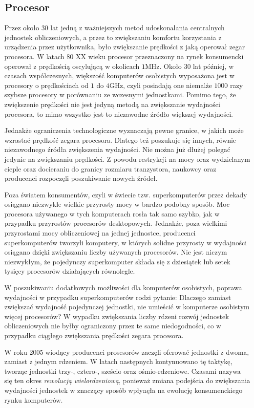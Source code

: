 \subsection{Procesor}
Przez około 30 lat jedną z ważniejszych metod udoskonalania centralnych jednostek obliczeniowych, a przez to zwiększaniu komfortu korzystania z urządzenia przez użytkownika, było zwiększanie prędkości z jaką operował zegar procesora. W latach 80 XX wieku procesor przeznaczony na rynek konsumencki operował z prędkością oscylującą w okolicach $1$MHz. Około 30 lat później, w czasach współczesnych, większość komputerów osobistych wyposażona jest w procesory o prędkościach od $1$ do $4$GHz, czyli posiadają one niemalże $1000$ razy szybsze procesory w porównaniu ze wczesnymi jednostkami. Pomimo tego, że zwiększenie prędkości nie jest jedyną metodą na zwiększanie wydajności procesora, to mimo wszystko jest to niezawodne źródło większej wydajności.

Jednakże ograniczenia technologiczne wyznaczają pewne granice, w jakich może wzrastać prędkość zegara procesora. Dlatego też poszukuje się innych, równie niezawodnego źródła zwiększenia wydajności. Nie można już dłużej polegać jedynie na zwiększaniu prędkości. Z powodu restrykcji na mocy oraz wydzielanym cieple oraz docieraniu do granicy rozmiaru tranzystora, naukowcy oraz producenci rozpoczęli poszukiwanie nowych źródeł.

Poza światem konsumentów, czyli w świecie tzw. superkomputerów przez dekady osiągano niezwykle wielkie przyrosty mocy w bardzo podobny sposób. Moc procesora używanego w tych komputerach rosła tak samo szybko, jak w przypadku przyrostów procesorów desktopowych. Jednakże, poza wielkimi przyrostami mocy obliczeniowej na jednej jednostce, producenci superkomputerów tworzyli komputery, w których solidne przyrosty w wydajności osiągano dzięki zwiększaniu liczby używanych procesorów. Nie jest niczym niezwykłym, że pojedynczy superkomputer składa się z dziesiątek lub setek tysięcy procesorów działających równolegle.

W poszukiwaniu dodatkowych możliwości dla komputerów osobistych, poprawa wydajności w przypadku superkomputerów rodzi pytanie: Dlaczego zamiast zwiększać wydajność pojedynczej jednostki, nie umieścić w komputerze osobistym więcej procesorów? W wypadku zwiększania liczby rdzeni rozwój jednostek obliczeniowych nie byłby ograniczony przez te same niedogodności, co w przypadku ciągłego zwiększania prędkości zegara procesora.

W roku 2005 wiodący producenci prosesorów zaczęli oferować jednostki z dwoma, zamiast z jednym rdzeniem. W latach następnych kontynuowano tę taktykę, tworząc jednostki trzy-, cztero-, sześcio oraz ośmio-rdzeniowe. Czasami nazywa się ten okres \emph{rewolucją wielordzeniową}, ponieważ zmiana podejścia do zwiększania wydajności jednostek w znaczący sposób wpłynęła na ewolucję konsumenckiego rynku komputerów.


